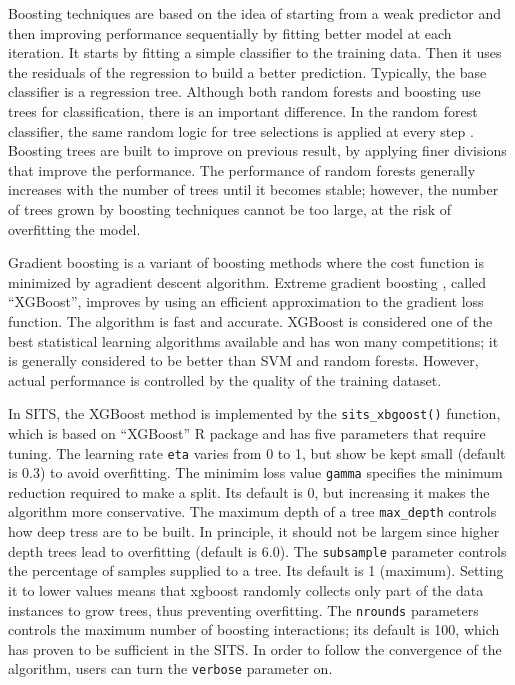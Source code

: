 \documentclass[a4paper,]{tufte-book}
\begin{document}
Boosting techniques are based on the idea of starting from a weak predictor and then improving performance sequentially by fitting better model at each iteration. It starts by fitting a simple classifier to the training data. Then it uses the residuals of the regression to build a better prediction. Typically, the base classifier is a regression tree. Although both random forests and boosting use trees for classification, there is an important difference. In the random forest classifier, the same random logic for tree selections is applied at every step \citep{Efron2016}. Boosting trees are built to improve on previous result, by applying finer divisions that improve the performance. The performance of random forests generally increases with the number of trees until it becomes stable; however, the number of trees grown by boosting techniques cannot be too large, at the risk of overfitting the model.

Gradient boosting is a variant of boosting methods where the cost function is minimized by agradient descent algorithm. Extreme gradient boosting \citep{Chen2016}, called ``XGBoost'', improves by using an efficient approximation to the gradient loss function. The algorithm is fast and accurate. XGBoost is considered one of the best statistical learning algorithms available and has won many competitions; it is generally considered to be better than SVM and random forests. However, actual performance is controlled by the quality of the training dataset.

In SITS, the XGBoost method is implemented by the \texttt{sits\_xbgoost()} function, which is based on ``XGBoost'' R package and has five parameters that require tuning. The learning rate \texttt{eta} varies from 0 to 1, but show be kept small (default is 0.3) to avoid overfitting. The minimim loss value \texttt{gamma} specifies the minimum reduction required to make a split. Its default is 0, but increasing it makes the algorithm more conservative. The maximum depth of a tree \texttt{max\_depth} controls how deep tress are to be built. In principle, it should not be largem since higher depth trees lead to overfitting (default is 6.0). The \texttt{subsample} parameter controls the percentage of samples supplied to a tree. Its default is 1 (maximum). Setting it to lower values means that xgboost randomly collects only part of the data instances to grow trees, thus preventing overfitting. The \texttt{nrounds} parameters controls the maximum number of boosting interactions; its default is 100, which has proven to be sufficient in the SITS. In order to follow the convergence of the algorithm, users can turn the \texttt{verbose} parameter on.
\end{document}
